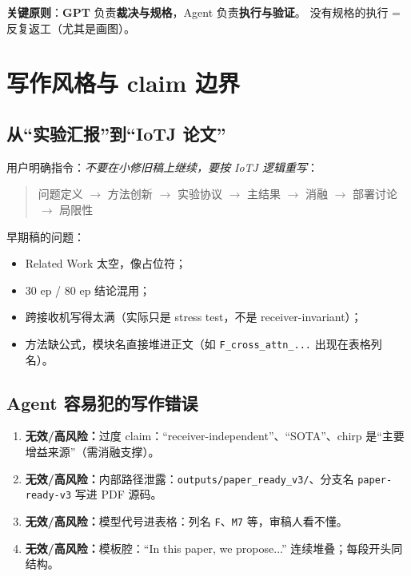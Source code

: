 \documentclass[11pt,a4paper]{ctexart}
\newcommand{\gpt}{\textbf{GPT}}
\newcommand{\bad}[1]{\textcolor{red!70!black}{\textbf{无效/高风险：}#1}}
\begin{document}
\textbf{关键原则}：\gpt{} 负责\textbf{裁决与规格}，Agent 负责\textbf{执行与验证}。
没有规格的执行 = 反复返工（尤其是画图）。

\section{写作风格与 claim 边界}
\label{sec:writing}

\subsection{从``实验汇报''到``IoTJ 论文''}
用户明确指令：\emph{不要在小修旧稿上继续，要按 IoTJ 逻辑重写}：
\begin{quote}
  问题定义 $\to$ 方法创新 $\to$ 实验协议 $\to$ 主结果 $\to$ 消融 $\to$ 部署讨论 $\to$ 局限性
\end{quote}

早期稿的问题：
\begin{itemize}
  \item Related Work 太空，像占位符；
  \item 30 ep / 80 ep 结论混用；
  \item 跨接收机写得太满（实际只是 stress test，不是 receiver-invariant）；
  \item 方法缺公式，模块名直接堆进正文（如 \texttt{F\_cross\_attn\_...} 出现在表格列名）。
\end{itemize}

\subsection{Agent 容易犯的写作错误}
\begin{enumerate}
  \item \bad{过度 claim}：``receiver-independent''、``SOTA''、chirp 是``主要增益来源''（需消融支撑）。
  \item \bad{内部路径泄露}：\texttt{outputs/paper\_ready\_v3/}、分支名 \texttt{paper-ready-v3} 写进 PDF 源码。
  \item \bad{模型代号进表格}：列名 \texttt{F}、\texttt{M7} 等，审稿人看不懂。
  \item \bad{模板腔}：``In this paper, we propose...'' 连续堆叠；每段开头同结构。
\end{enumerate}
\end{document}
